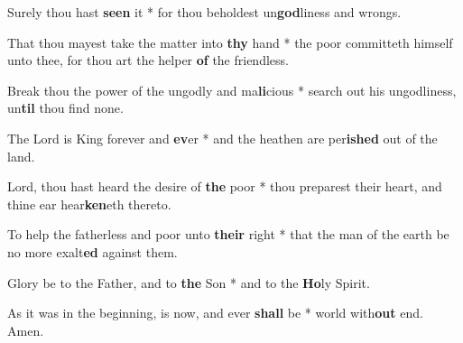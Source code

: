 \begin{multicols}{2}
	Surely thou hast \textbf{seen} it * for thou beholdest un\textbf{god}liness and wrongs.
	
	That thou mayest take the matter into \textbf{thy} hand * the poor committeth himself unto thee, for thou art the helper \textbf{of} the friendless.
	
	Break thou the power of the ungodly and ma\textbf{li}cious * search out his ungodliness, un\textbf{til} thou find none.
	
	The Lord is King forever and \textbf{ev}er * and the heathen are per\textbf{ished} out of the land.
	
	Lord, thou hast heard the desire of \textbf{the} poor * thou preparest their heart, and thine ear hear\textbf{ken}eth thereto.
	
	To help the fatherless and poor unto \textbf{their} right * that the man of the earth be no more exalt\textbf{ed} against them.
	
	Glory be to the Father, and to \textbf{the} Son * and to the \textbf{Ho}ly Spirit.
	
	As it was in the beginning, is now, and ever \textbf{shall} be * world with\textbf{out} end. Amen.
\end{multicols}